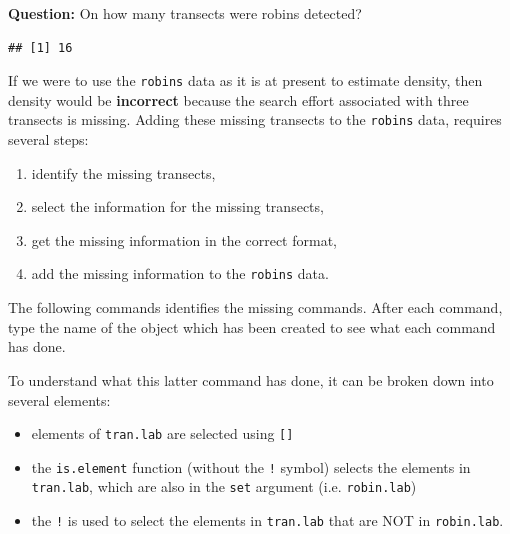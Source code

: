 \documentclass[10pt,a4paper]{tufte-handout}
\newenvironment{Shaded}{\begin{snugshade}}{\end{snugshade}}
\newcommand{\DataTypeTok}[1]{\textcolor[rgb]{0.13,0.29,0.53}{#1}}
\newcommand{\KeywordTok}[1]{\textcolor[rgb]{0.13,0.29,0.53}{\textbf{#1}}}
\newcommand{\NormalTok}[1]{#1}
\newcommand{\OperatorTok}[1]{\textcolor[rgb]{0.81,0.36,0.00}{\textbf{#1}}}
\newcommand{\StringTok}[1]{\textcolor[rgb]{0.31,0.60,0.02}{#1}}
\providecommand{\tightlist}{%
  \setlength{\itemsep}{0pt}\setlength{\parskip}{0pt}}
\begin{document}
\begin{marginfigure}
\textbf{Question:} On how many transects were robins detected?
\end{marginfigure}

\begin{Shaded}
\end{Shaded}

\begin{verbatim}
## [1] 16
\end{verbatim}

If we were to use the \texttt{robins} data as it is at present to
estimate density, then density would be \textbf{incorrect} because the
search effort associated with three transects is missing. Adding these
missing transects to the \texttt{robins} data, requires several steps:

\begin{enumerate}
\def\labelenumi{\arabic{enumi}.}
\tightlist
\item
  identify the missing transects,
\item
  select the information for the missing transects,
\item
  get the missing information in the correct format,
\item
  add the missing information to the \texttt{robins} data.
\end{enumerate}

The following commands identifies the missing commands. After each
command, type the name of the object which has been created to see what
each command has done.

\begin{Shaded}
\end{Shaded}

To understand what this latter command has done, it can be broken down
into several elements:

\begin{itemize}
\tightlist
\item
  elements of \texttt{tran.lab} are selected using \texttt{{[}{]}}
\item
  the \texttt{is.element} function (without the \texttt{!} symbol)
  selects the elements in \texttt{tran.lab}, which are also in the
  \texttt{set} argument (i.e. \texttt{robin.lab})
\item
  the \texttt{!} is used to select the elements in \texttt{tran.lab}
  that are NOT in \texttt{robin.lab}.
\end{itemize}
\end{document}
